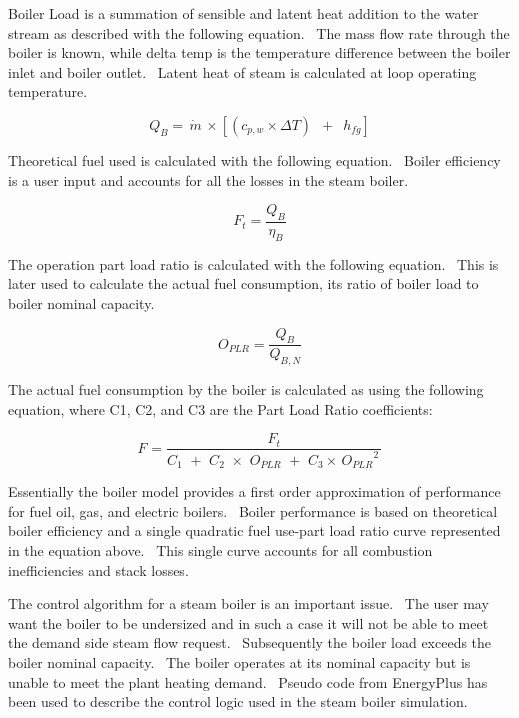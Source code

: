 Boiler Load is a summation of sensible and latent heat addition to the water stream as described with the following equation.~ The mass flow rate through the boiler is known, while delta temp is the temperature difference between the boiler inlet and boiler outlet.~ Latent heat of steam is calculated at loop operating temperature.

\begin{equation}
{Q_B} = \,\dot m\, \times \left[ {({c_{p,w}} \times \Delta T)\,\,\, + \,\,\,{h_{fg}}} \right]
\end{equation}

Theoretical fuel used is calculated with the following equation.~ Boiler efficiency is a user input and accounts for all the losses in the steam boiler.

\begin{equation}
{F_t} = \frac{{{Q_B}}}{{{\eta_B}}}
\end{equation}

The operation part load ratio is calculated with the following equation.~ This is later used to calculate the actual fuel consumption, its ratio of boiler load to boiler nominal capacity.

\begin{equation}
{O_{PLR}} = \frac{{{Q_B}}}{{{Q_{B,N}}}}
\end{equation}

The actual fuel consumption by the boiler is calculated as using the following equation, where C1, C2, and C3 are the Part Load Ratio coefficients:

\begin{equation}
{F_{}} = \frac{{{F_t}}}{{{C_1}\,\, + \,\,{C_2}\,\, \times \,\,{O_{PLR}}\,\, + \,\,{C_3} \times \,{O_{PLR}}^2\,}}
\end{equation}

Essentially the boiler model provides a first order approximation of performance for fuel oil, gas, and electric boilers.~ Boiler performance is based on theoretical boiler efficiency and a single quadratic fuel use-part load ratio curve represented in the equation above.~ This single curve accounts for all combustion inefficiencies and stack losses.

The control algorithm for a steam boiler is an important issue.~ The user may want the boiler to be undersized and in such a case it will not be able to meet the demand side steam flow request.~ Subsequently the boiler load exceeds the boiler nominal capacity.~ The boiler operates at its nominal capacity but is unable to meet the plant heating demand.~ Pseudo code from EnergyPlus has been used to describe the control logic used in the steam boiler simulation.

